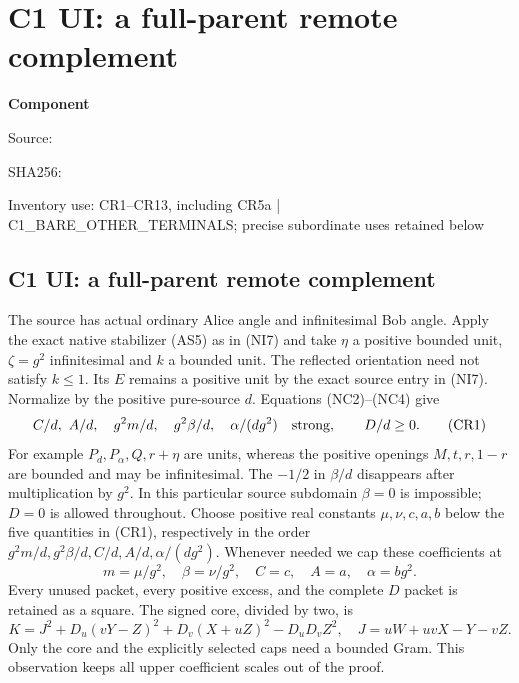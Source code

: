 \chapter{C1 UI: a full-parent remote complement}
\label{component:p013c226a79b3}
\noindent\textbf{Component }\par
{\small\noindent Source: \par}
{\small\noindent SHA256: \par}
{\small\noindent Inventory use: CR1--CR13, including CR5a | C1\_\allowbreak{}BARE\_\allowbreak{}OTHER\_\allowbreak{}TERMINALS; precise subordinate uses retained below\par}
\medskip
\section{C1 UI: a full-parent remote complement}
\label{p013c226a79b3:sec:c1-ui-remote}
The source has actual ordinary Alice angle and infinitesimal Bob
angle. Apply the exact native stabilizer (AS5) as in (NI7) and take
$\eta$ a positive bounded unit, $\zeta=g^2$ infinitesimal and $k$ a
bounded unit. The reflected orientation need not satisfy $k\le1$.
Its $E$ remains a positive unit by the exact source entry in (NI7).
Normalize by the positive pure-source $d$.
Equations (NC2)--(NC4) give
\[
 C/d,\ A/d,\quad g^2m/d,\quad g^2\beta/d,\quad
 \alpha/(dg^2)\quad\hbox{strong},\qquad D/d\ge0.       \tag{CR1}
\]
For example $P_d,P_\alpha,Q,r+\eta$ are units, whereas the
positive openings $M,t,r,1-r$ are bounded and may be infinitesimal.
The $-1/2$ in $\beta/d$ disappears after multiplication by $g^2$.
In this particular source subdomain $\beta=0$ is impossible; $D=0$
is allowed throughout. Choose positive real constants
$\mu,\nu,c,a,b$ below the five quantities in (CR1), respectively
in the order $g^2m/d,g^2\beta/d,C/d,A/d,\alpha/(dg^2)$.
Whenever needed we cap these coefficients at
\[
 m=\mu/g^2,\quad\beta=\nu/g^2,\quad C=c,\quad A=a,
 \quad\alpha=bg^2.                                  \tag{CR2}
\]
Every unused packet, every positive excess, and the complete $D$
packet is retained as a square. The signed core, divided by two, is
\[
 K=J^2+D_u(vY-Z)^2+D_v(X+uZ)^2-D_uD_vZ^2,
 \quad J=uW+uvX-Y-vZ.                              \tag{CR3}
\]
Only the core and the explicitly selected caps need a bounded Gram.
This observation keeps all upper coefficient scales out of the proof.

